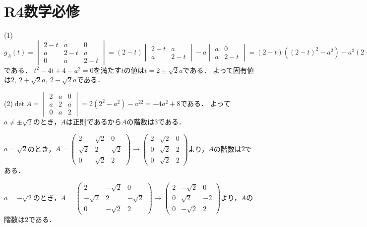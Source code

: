 \documentclass[
		book,
		head_space=20mm,
		foot_space=20mm,
		gutter=10mm,
		line_length=190mm
]{jlreq}
\begin{document}
\section{R4数学必修}
(1)$g_A(t)=\begin{vmatrix}
	2-t & a & 0 \\
	a & 2-t & a \\
	0 & a & 2-t
\end{vmatrix}=(2-t)\begin{vmatrix}
	2-t & a \\
	a & 2-t
\end{vmatrix}-a\begin{vmatrix}
	a & 0 \\
	a & 2-t
	\end{vmatrix}=(2-t)((2-t)^2-a^2)-a^2(2-t)=(2-t)(t^2-4t+4-a^2)$である．
	$t^2-4t+4-a^2=0$を満たす$t$の値は$t=2\pm\sqrt{2}a$である．
	よって固有値は$2,\ 2+\sqrt{2}a,\ 2-\sqrt{2}a$である．

(2)$\det A=\begin{vmatrix}
	2 & a & 0 \\
	a & 2 & a \\
	0 & a & 2
\end{vmatrix}=2(2^2-a^2)-a^22=-4a^2+8$である．
よって$a\neq \pm\sqrt{2}$のとき，$A$は正則であるから$A$の階数は$3$である．

$a=\sqrt{2}$のとき，$A=\begin{pmatrix}
	2 & \sqrt{2} & 0 \\
	\sqrt{2} & 2 & \sqrt{2} \\
	0 & \sqrt{2} & 2
\end{pmatrix}\rightarrow \begin{pmatrix}
	2 & \sqrt{2} & 0 \\
	0 & \sqrt{2} & 2 \\
	0 & \sqrt{2} & 2
	\end{pmatrix}$より，$A$の階数は$2$である．

$a=-\sqrt{2}$のとき，$A=\begin{pmatrix}
	2 & -\sqrt{2} & 0 \\
	-\sqrt{2} & 2 & -\sqrt{2} \\
	0 & -\sqrt{2} & 2
\end{pmatrix}\rightarrow \begin{pmatrix}
	2 & -\sqrt{2} & 0 \\
	0 & \sqrt{2} & -2 \\
	0 & -\sqrt{2} & 2
	\end{pmatrix}$より，$A$の階数は$2$である．
\end{document}
